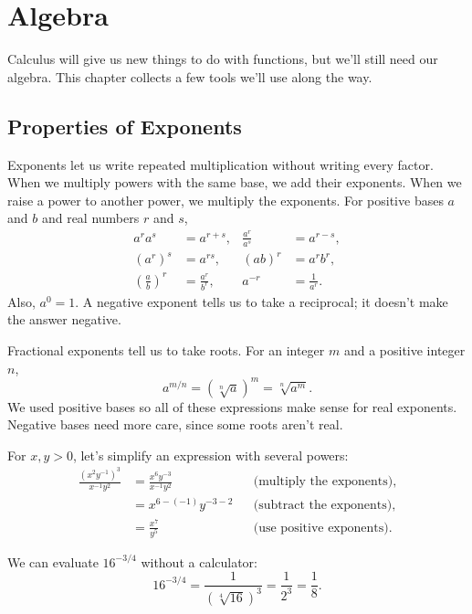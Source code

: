 \section{Algebra}
\label{sec:algebra}

Calculus will give us new things to do with functions, but we'll still
need our algebra. This chapter collects a few tools we'll use along
the way.

\subsection{Properties of Exponents}
\label{sec:exponent-properties}

Exponents let us write repeated multiplication without writing every
factor. When we multiply powers with the same base, we add their
exponents. When we raise a power to another power, we multiply the
exponents. For positive bases $a$ and $b$ and real numbers $r$ and $s$,
\begin{align*}
a^ra^s&=a^{r+s},
&\frac{a^r}{a^s}&=a^{r-s},\\
(a^r)^s&=a^{rs},
&(ab)^r&=a^rb^r,\\
\left(\frac ab\right)^r&=\frac{a^r}{b^r},
&a^{-r}&=\frac1{a^r}.
\end{align*}
Also, $a^0=1$. A negative exponent tells us to take a reciprocal;
it doesn't make the answer negative.

Fractional exponents tell us to take roots. For an integer $m$ and
a positive integer $n$,
$$a^{m/n}=\left(\sqrt[n]{a}\right)^m=\sqrt[n]{a^m}.$$
We used positive bases so all of these expressions make sense for
real exponents. Negative bases need more care, since some roots
aren't real.

\begin{exampleblock}
For $x,y>0$, let's simplify an expression with several powers:
\begin{align*}
\frac{(x^2y^{-1})^3}{x^{-1}y^2}
&=\frac{x^6y^{-3}}{x^{-1}y^2}
&&\text{(multiply the exponents)},\\
&=x^{6-(-1)}y^{-3-2}
&&\text{(subtract the exponents)},\\
&=\frac{x^7}{y^5}
&&\text{(use positive exponents)}.
\end{align*}
\end{exampleblock}

\begin{exampleblock}
We can evaluate $16^{-3/4}$ without a calculator:
$$16^{-3/4}=\frac1{(\sqrt[4]{16})^3}=\frac1{2^3}=\frac18.$$
\end{exampleblock}

